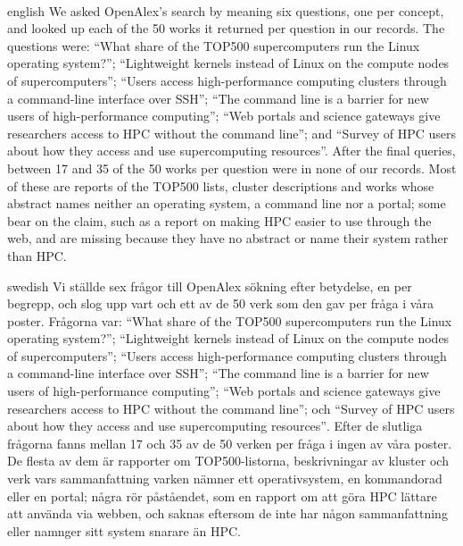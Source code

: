 \paragraph{} %
\begin{onlyin}{english} %
We asked OpenAlex's search by meaning six questions, one per concept, and
looked up each of the 50 works it returned per question in our records.
The questions were: \enquote{What share of the TOP500 supercomputers run
the Linux operating system?}; \enquote{Lightweight kernels instead of
Linux on the compute nodes of supercomputers}; \enquote{Users access
high-performance computing clusters through a command-line interface over
SSH}; \enquote{The command line is a barrier for new users of
high-performance computing}; \enquote{Web portals and science gateways
give researchers access to HPC without the command line}; and
\enquote{Survey of HPC users about how they access and use supercomputing
resources}.  After the final queries, between 17 and 35 of the 50 works
per question were in none of our records.  Most of these are reports of
the TOP500 lists, cluster descriptions and works whose abstract names
neither an operating system, a command line nor a portal; some bear on
the claim, such as a report on making HPC easier to use through the web,
and are missing because they have no abstract or name their system
rather than HPC.
\end{onlyin}
\begin{onlyin}{swedish}
Vi ställde sex frågor till OpenAlex sökning efter betydelse, en per
begrepp, och slog upp vart och ett av de 50 verk som den gav per fråga i
våra poster.  Frågorna var: \foreignlanguage{english}{\enquote{What share
of the TOP500 supercomputers run the Linux operating system?};
\enquote{Lightweight kernels instead of Linux on the compute nodes of
supercomputers}; \enquote{Users access high-performance computing
clusters through a command-line interface over SSH}; \enquote{The
command line is a barrier for new users of high-performance computing};
\enquote{Web portals and science gateways give researchers access to HPC
without the command line}}; och \foreignlanguage{english}{\enquote{Survey
of HPC users about how they access and use supercomputing resources}}.
Efter de slutliga frågorna fanns mellan 17 och 35 av de 50 verken per
fråga i ingen av våra poster.  De flesta av dem är rapporter om
TOP500-listorna, beskrivningar av kluster och verk vars sammanfattning
varken nämner ett operativsystem, en kommandorad eller en portal; några
rör påståendet, som en rapport om att göra HPC lättare att använda via
webben, och saknas eftersom de inte har någon sammanfattning eller
namnger sitt system snarare än HPC.
\end{onlyin}


